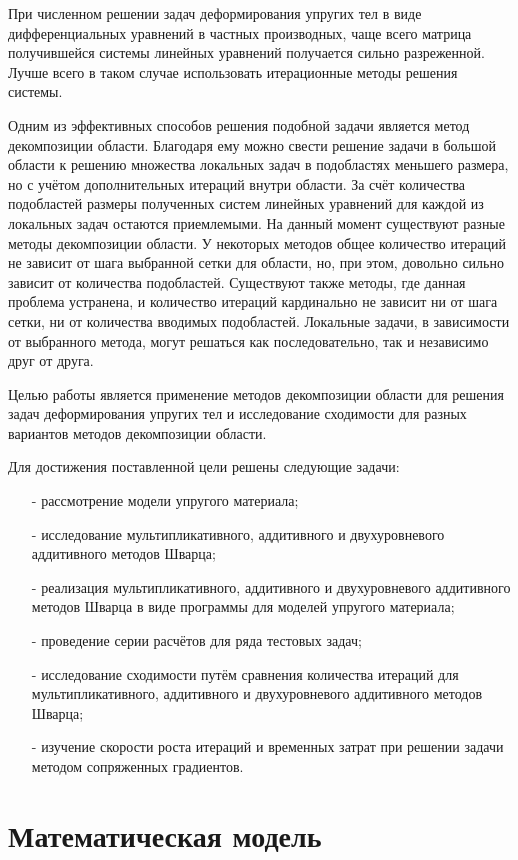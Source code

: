 \documentclass[a4paper, 14pt]{extarticle}
\begin{document}
При численном решении задач деформирования упругих тел в виде дифференциальных уравнений в частных производных, чаще всего матрица получившейся системы линейных уравнений получается сильно разреженной. Лучше всего в таком случае использовать итерационные методы решения системы. 

Одним из эффективных способов решения подобной задачи является метод декомпозиции области. Благодаря ему можно свести решение задачи в большой области к решению множества локальных задач в подобластях меньшего размера, но с учётом дополнительных итераций внутри области. За счёт количества подобластей размеры полученных систем линейных уравнений для каждой из локальных задач остаются приемлемыми. На данный момент существуют разные методы декомпозиции области. У некоторых методов общее количество итераций не зависит от шага выбранной сетки для области, но, при этом, довольно сильно зависит от количества подобластей. Существуют также методы, где данная проблема устранена, и количество итераций кардинально не зависит ни от шага сетки, ни от количества вводимых подобластей. Локальные задачи, в зависимости от выбранного метода, могут решаться как последовательно, так и независимо друг от друга.

Целью работы является применение методов декомпозиции области для решения задач деформирования упругих тел и исследование сходимости для разных вариантов методов декомпозиции области.

Для достижения поставленной цели решены следующие задачи:
\begin{itemize}
\item[-]рассмотрение модели упругого материала;
\item[-]исследование мультипликативного, аддитивного и двухуровневого аддитивного методов Шварца;
\item[-]реализация мультипликативного, аддитивного и двухуровневого аддитивного методов Шварца в виде программы для моделей упругого материала;
\item[-]проведение серии расчётов для ряда тестовых задач;
\item[-]исследование сходимости путём сравнения количества итераций для мультипликативного, аддитивного и двухуровневого аддитивного методов Шварца;
\item[-]изучение скорости роста итераций и временных затрат при решении задачи методом сопряженных градиентов.
\end{itemize}

\newpage
 
\section{Математическая модель}
\end{document}
